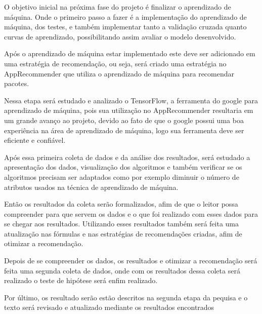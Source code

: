 \begin{table}[h]
\centering
{}
\caption{Atividades a serem realizadas}
\label{tab:atividades_futuras}
\end{table}

O objetivo inicial na próxima fase do projeto é finalizar o aprendizado
de máquina. Onde o primeiro passo a fazer é a implementação do aprendizado
de máquina, dos testes, e também implementar tanto a validação cruzada quanto
curvas de aprendizado, possibilitando assim avaliar o modelo desenvolvido.

Após o aprendizado de máquina estar implementado este deve ser adicionado
em uma estratégia de recomendação, ou seja, será criado uma estratégia
no AppRecommender que utiliza o aprendizado de máquina para recomendar
pacotes.

Nessa etapa será estudado e analizado o TensorFlow, a ferramenta do
google para aprendizado de máquina, pois sua utilização no AppRecommender
resultaria em um grande avanço ao projeto, devido ao fato de que o
google possui uma boa experiência na área de aprendizado de máquina,
logo sua ferramenta deve ser eficiente e confiável.

Após essa primeira coleta de dados e da análise dos resultados, será
estudado a apresentação dos dados, visualização dos algoritmos e também
verificar se os algoritmos precisam ser adaptados como por exemplo
diminuir o número de atributos usados na técnica de aprendizado de máquina.

Então os resultados da coleta serão formalizados, afim de que o leitor
possa compreender para que servem os dados e o que foi realizado com esses
dados para se chegar aos resultados. Utilizando esses resultados também
será feita uma atualização nas fórmulas e nas estratégias de recomendações
criadas, afim de otimizar a recomendação.

Depois de se compreender os dados, os resultados e otimizar a recomendação
será feita uma segunda coleta de dados, onde com os resultados dessa coleta
será realizado o teste de hipótese será enfim realizado.

Por último, os resultado serão estão descritos na segunda etapa da pequisa e o
texto será revisado e atualizado mediante os resultados encontrados
